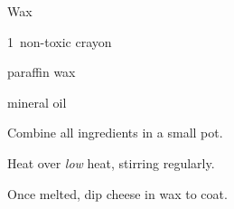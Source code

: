 \begin{recipe}{Wax}{}{}

\begin{ingredients}
\item 1~non-toxic crayon
\item {} paraffin wax
\item {} mineral oil
\end{ingredients}

\begin{directions}
\item Combine all ingredients in a small pot.
\item Heat over \emph{low} heat, stirring regularly.
\item Once melted, dip cheese in wax to coat.
\end{directions}

\end{recipe}
